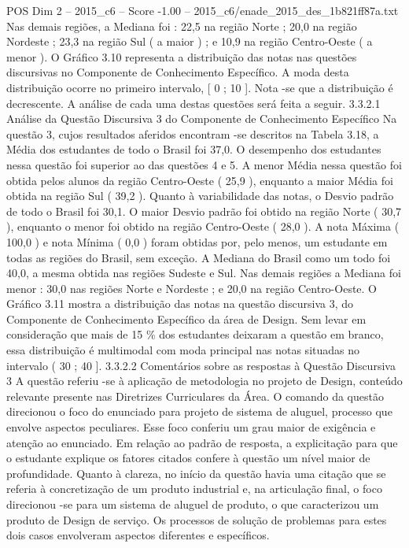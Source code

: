 \begin{textsample}{POS Dim 2 – 2015\_c6 – Score -1.00 – 2015\_c6/enade\_2015\_des\_1b821ff87a.txt}
Nas demais regiões, a Mediana foi : 22,5 na região Norte ; 20,0 na região Nordeste ; 23,3 na região Sul ( a maior ) ; e 10,9 na região Centro-Oeste ( a menor ).
O Gráfico 3.10 representa a distribuição das notas nas questões discursivas no Componente de Conhecimento Específico.
A moda desta distribuição ocorre no primeiro intervalo, [ 0 ; 10 ].
Nota -se que a distribuição é decrescente.
A análise de cada uma destas questões será feita a seguir. 3.3.2.1 Análise da Questão Discursiva 3 do Componente de Conhecimento Específico Na questão 3, cujos resultados aferidos encontram -se descritos na Tabela 3.18, a Média dos estudantes de todo o Brasil foi 37,0.
O desempenho dos estudantes nessa questão foi superior ao das questões 4 e 5.
A menor Média nessa questão foi obtida pelos alunos da região Centro-Oeste ( 25,9 ), enquanto a maior Média foi obtida na região Sul ( 39,2 ).
Quanto à variabilidade das notas, o Desvio padrão de todo o Brasil foi 30,1.
O maior Desvio padrão foi obtido na região Norte ( 30,7 ), enquanto o menor foi obtido na região Centro-Oeste ( 28,0 ).
A nota Máxima ( 100,0 ) e nota Mínima ( 0,0 ) foram obtidas por, pelo menos, um estudante em todas as regiões do Brasil, sem exceção.
A Mediana do Brasil como um todo foi 40,0, a mesma obtida nas regiões Sudeste e Sul.
Nas demais regiões a Mediana foi menor : 30,0 nas regiões Norte e Nordeste ; e 20,0 na região Centro-Oeste.
O Gráfico 3.11 mostra a distribuição das notas na questão discursiva 3, do Componente de Conhecimento Específico da área de Design.
Sem levar em consideração que mais de 15 \% dos estudantes deixaram a questão em branco, essa distribuição é multimodal com moda principal nas notas situadas no intervalo ( 30 ; 40 ]. 3.3.2.2 Comentários sobre as respostas à Questão Discursiva 3 A questão referiu -se à aplicação de metodologia no projeto de Design, conteúdo relevante presente nas Diretrizes Curriculares da Área.
O comando da questão direcionou o foco do enunciado para projeto de sistema de aluguel, processo que envolve aspectos peculiares.
Esse foco conferiu um grau maior de exigência e atenção ao enunciado.
Em relação ao padrão de resposta, a explicitação para que o estudante explique os fatores citados confere à questão um nível maior de profundidade.
Quanto à clareza, no início da questão havia uma citação que se referia à concretização de um produto industrial e, na articulação final, o foco direcionou -se para um sistema de aluguel de produto, o que caracterizou um produto de Design de serviço.
Os processos de solução de problemas para estes dois casos envolveram aspectos diferentes e específicos.

\end{textsample}
